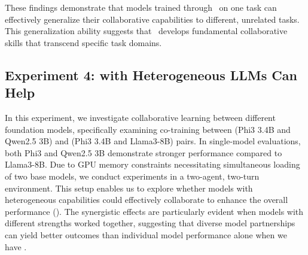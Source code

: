 These findings demonstrate that models trained through \ours~on one task can effectively generalize their collaborative capabilities to different, unrelated tasks. This generalization ability suggests that \ours~develops fundamental collaborative skills that transcend specific task domains.




\subsection{{Experiment 4: \oursspace with Heterogeneous LLMs Can Help}}
\label{sec:exp4}
In this experiment, we investigate collaborative learning between different foundation models, specifically examining co-training between (Phi3 3.4B and Qwen2.5 3B) and (Phi3 3.4B and Llama3-8B) pairs. In single-model evaluations, both Phi3 and Qwen2.5 3B demonstrate stronger performance compared to Llama3-8B. Due to GPU memory constraints necessitating simultaneous loading of two base models, we conduct experiments in a two-agent, two-turn environment. This setup enables us to explore whether models with heterogeneous capabilities could effectively collaborate to enhance the overall performance (). The synergistic effects are particularly evident when models with different strengths worked together, suggesting that diverse model partnerships can yield better outcomes than individual model performance alone when we have \ours. 


